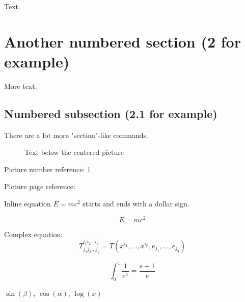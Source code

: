 \documentclass[12pt, a4paper]{article} %
\begin{document}
Text.

\section{Another numbered section (2 for example)}

More text.

\subsection{Numbered subsection (2.1 for example)}

There are a lot more "section"-like commands.



\begin{figure}[H] %
    \centering
    \caption{Text below the centered picture}
    \label{fig:mozilla_picture_label}
\end{figure}

Picture number reference: \ref{fig:mozilla_picture_label}

Picture page reference: \pageref{fig:mozilla_picture_label}

%
%
%



Inline equation $E=mc^2$ starts and ends with a dollar sign.

\begin{equation} %
E=mc^2
\end{equation}

Complex equation:
$$T^{i_1 i_2 \dots i_p}_{j_1 j_2 \dots j_q} = T(x^{i_1},\dots,x^{i_p},e_{j_1},\dots,e_{j_q})$$

$$\int_0^1 \frac{1}{e^x} =  \frac{e-1}{e}$$

$\sin(\beta)$, $\cos(\alpha)$, $\log(x)$
\end{document}

